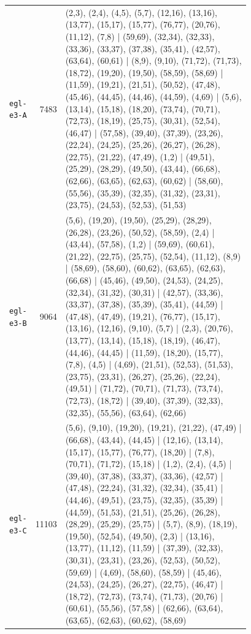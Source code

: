 \begin{landscape}
\begin{longtable}{lr>{\tiny\raggedright\arraybackslash}p{0.78\linewidth}}
\texttt{egl-e3-A} & 7483 & (2,3), (2,4), (4,5), (5,7), (12,16), (13,16), (13,77), (15,17), (15,77), (76,77), (20,76), (11,12), (7,8) | (59,69), (32,34), (32,33), (33,36), (33,37), (37,38), (35,41), (42,57), (63,64), (60,61) | (8,9), (9,10), (71,72), (71,73), (18,72), (19,20), (19,50), (58,59), (58,69) | (11,59), (19,21), (21,51), (50,52), (47,48), (45,46), (44,45), (44,46), (44,59), (4,69) | (5,6), (13,14), (15,18), (18,20), (73,74), (70,71), (72,73), (18,19), (25,75), (30,31), (52,54), (46,47) | (57,58), (39,40), (37,39), (23,26), (22,24), (24,25), (25,26), (26,27), (26,28), (22,75), (21,22), (47,49), (1,2) | (49,51), (25,29), (28,29), (49,50), (43,44), (66,68), (62,66), (63,65), (62,63), (60,62) | (58,60), (55,56), (35,39), (32,35), (31,32), (23,31), (23,75), (24,53), (52,53), (51,53) \\[2pt]
\texttt{egl-e3-B} & 9064 & (5,6), (19,20), (19,50), (25,29), (28,29), (26,28), (23,26), (50,52), (58,59), (2,4) | (43,44), (57,58), (1,2) | (59,69), (60,61), (21,22), (22,75), (25,75), (52,54), (11,12), (8,9) | (58,69), (58,60), (60,62), (63,65), (62,63), (66,68) | (45,46), (49,50), (24,53), (24,25), (32,34), (31,32), (30,31) | (42,57), (33,36), (33,37), (37,38), (35,39), (35,41), (44,59) | (47,48), (47,49), (19,21), (76,77), (15,17), (13,16), (12,16), (9,10), (5,7) | (2,3), (20,76), (13,77), (13,14), (15,18), (18,19), (46,47), (44,46), (44,45) | (11,59), (18,20), (15,77), (7,8), (4,5) | (4,69), (21,51), (52,53), (51,53), (23,75), (23,31), (26,27), (25,26), (22,24), (49,51) | (71,72), (70,71), (71,73), (73,74), (72,73), (18,72) | (39,40), (37,39), (32,33), (32,35), (55,56), (63,64), (62,66) \\[2pt]
\texttt{egl-e3-C} & 11103 & (5,6), (9,10), (19,20), (19,21), (21,22), (47,49) | (66,68), (43,44), (44,45) | (12,16), (13,14), (15,17), (15,77), (76,77), (18,20) | (7,8), (70,71), (71,72), (15,18) | (1,2), (2,4), (4,5) | (39,40), (37,38), (33,37), (33,36), (42,57) | (47,48), (22,24), (31,32), (32,34), (35,41) | (44,46), (49,51), (23,75), (32,35), (35,39) | (44,59), (51,53), (21,51), (25,26), (26,28), (28,29), (25,29), (25,75) | (5,7), (8,9), (18,19), (19,50), (52,54), (49,50), (2,3) | (13,16), (13,77), (11,12), (11,59) | (37,39), (32,33), (30,31), (23,31), (23,26), (52,53), (50,52), (59,69) | (4,69), (58,60), (58,59) | (45,46), (24,53), (24,25), (26,27), (22,75), (46,47) | (18,72), (72,73), (73,74), (71,73), (20,76) | (60,61), (55,56), (57,58) | (62,66), (63,64), (63,65), (62,63), (60,62), (58,69) \\[2pt]

\end{longtable}
\end{landscape}
